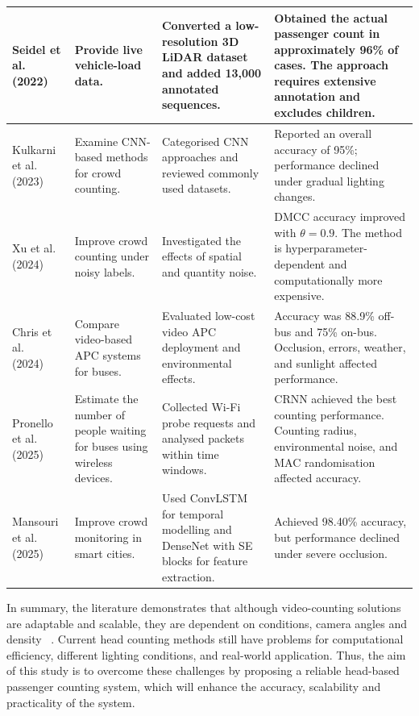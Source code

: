 \documentclass[12pt,a4paper]{report}
\begin{document}
\begin{longtable}{| 
		>{\raggedright\arraybackslash}p{2.2cm}| 
		>{\raggedright\arraybackslash}p{3.2cm}| 
		>{\raggedright\arraybackslash}p{4.0cm}| 
		>{\raggedright\arraybackslash}p{4.0cm}| 
	}
	Seidel et al. (2022)~\cite{seidel2022napc} 
	& 
	Provide live vehicle-load data. 
	& 
	Converted a low-resolution 3D LiDAR dataset and added 13,000 annotated sequences. 
	& 
	Obtained the actual passenger count in approximately 96\% of cases. The approach requires extensive annotation and excludes children. 
	\\ 
	\hline 
	
	Kulkarni et al. (2023)~\cite{kulkarni2023advances} 
	& 
	Examine CNN-based methods for crowd counting. 
	& 
	Categorised CNN approaches and reviewed commonly used datasets. 
	& 
	Reported an overall accuracy of 95\%; performance declined under gradual lighting changes. 
	\\ 
	\hline 
	
	Xu et al. (2024)~\cite{xu2024label} 
	& 
	Improve crowd counting under noisy labels. 
	& 
	Investigated the effects of spatial and quantity noise. 
	& 
	DMCC accuracy improved with $\theta=0.9$. The method is hyperparameter-dependent and computationally more expensive. 
	\\ 
	\hline 
	
	Chris et al. (2024)~\cite{Chris2024} 
	& 
	Compare video-based APC systems for buses. 
	& 
	Evaluated low-cost video APC deployment and environmental effects. 
	& 
	Accuracy was 88.9\% off-bus and 75\% on-bus. Occlusion, errors, weather, and sunlight affected performance. 
	\\ 
	\hline 
	
	Pronello et al. (2025)~\cite{pronello2025lowcost} 
	& 
	Estimate the number of people waiting for buses using wireless devices. 
	& 
	Collected Wi-Fi probe requests and analysed packets within time windows. 
	& 
	CRNN achieved the best counting performance. Counting radius, environmental noise, and MAC randomisation affected accuracy. 
	\\ 
	\hline 
	
	Mansouri et al. (2025)~\cite{mansouri2025deep} 
	& 
	Improve crowd monitoring in smart cities. 
	& 
	Used ConvLSTM for temporal modelling and DenseNet with SE blocks for feature extraction. 
	& 
	Achieved 98.40\% accuracy, but performance declined under severe occlusion. 
	\\ 
	\hline 
	
\end{longtable}

In summary, the literature demonstrates that although video-counting solutions are adaptable and scalable, they are dependent on conditions, camera angles and density ~\cite{Chris2023}. Current head counting methods still have problems for computational efficiency, different lighting conditions, and real-world application. Thus, the aim of this study is to overcome these challenges by proposing a reliable head-based passenger counting system, which will enhance the accuracy, scalability and practicality of the system.
\end{document}

